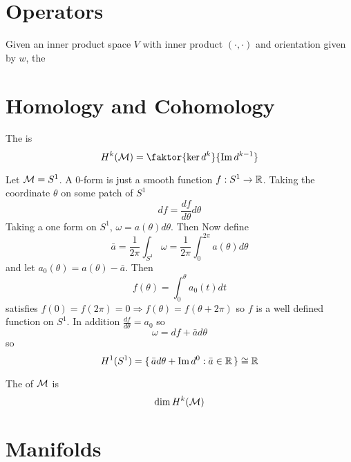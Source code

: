 \documentclass{article}
\begin{document}
\section{Operators}

\begin{definition}
Given an inner product space $V$ with inner product $(\cdot,\cdot)$ and orientation given by $w$, the  
\end{definition}

\section{Homology and Cohomology}

\begin{definition}
The  is
\[
H^k(\mc{M})=\faktor{\ker d^k}{\image d^{k-1}}
\]
\end{definition}

\begin{example}
Let $\mathcal{M}=S^1$. A 0-form is just a smooth function $f:S^1 \to \mathbb{R}$. Taking the coordinate $\theta$ on some patch of $S^1$ 
\[
df = \frac{df}{d\theta} d\theta 
\]
Taking a one form on $S^1$,  $\omega = a(\theta) d\theta$. Then 
Now define 
\[
\bar{a} =\frac{1}{2\pi} \int_{S^1} \omega =\frac{1}{2\pi} \int_0^{2\pi} a(\theta) d\theta
\]
and let $a_0(\theta) = a(\theta) - \bar{a}$. Then 
\[
f(\theta) = \int_0^\theta a_0(t) dt 
\]
satisfies $f(0) = f(2\pi)=0 \Rightarrow f(\theta) = f(\theta+2\pi)$ so $f$ is a well defined function on $S^1$. In addition $\frac{df}{d\theta} = a_0$ so 
\[
\omega = df + \bar{a} d\theta
\]
so 
\[
H^1(S^1) = \set{\bar{a}d\theta + \operatorname{Im}d^0 : \bar{a}\in\mathbb{R}} \cong \mathbb{R} 
\]
\begin{definition}
The  of $\mathcal{M}$ is 
\[
\dim H^k(\mathcal{M})
\]
\end{definition}

\end{example}


\section{Manifolds}
\end{document}

